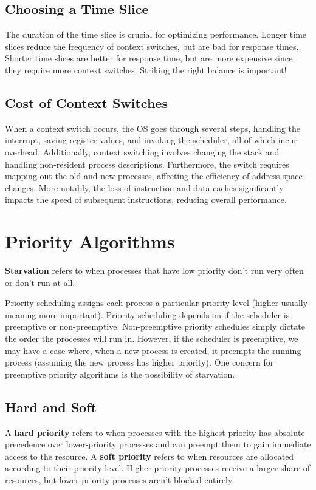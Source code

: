 \documentclass{report}
\newcommand{\definitionBegin}[1]{\begin{tcolorbox}[title={Definition: #1}]}
\newcommand{\definitionEnd}{\end{tcolorbox}}
\begin{document}
\subsection{Choosing a Time Slice}
The duration of the time slice is crucial for optimizing performance. Longer time slices reduce the
frequency of context switches, but are bad for response times. Shorter time slices are better for
response time, but are more expensive since they require more context switches. Striking the right
balance is important!


\subsection{Cost of Context Switches}
When a context switch occurs, the OS goes through several steps, handling the interrupt, saving
register values, and invoking the scheduler, all of which incur overhead. Additionally, context
switching involves changing the stack and handling non-resident process descriptions. Furthermore,
the switch requires mapping out the old and new processes, affecting the efficiency of address space
changes. More notably, the loss of instruction and data caches significantly impacts the speed of
subsequent instructions, reducing overall performance.


\section{Priority Algorithms}
\definitionBegin{Starvation}
\textbf{Starvation} refers to when processes that have low priority don't run very often or don't
run at all.
\definitionEnd

Priority scheduling assigns each process a particular priority level (higher usually meaning more
important). Priority scheduling depends on if the scheduler is preemptive or
non-preemptive. Non-preemptive priority schedules simply dictate the order the processes will run
in. However, if the scheduler is preemptive, we may have a case where, when a new process is
created, it preempts the running process (assuming the new process has higher priority). One concern
for preemptive priority algorithms is the possibility of starvation.


\subsection{Hard and Soft}
\definitionBegin{Hard and Soft Priorities}
A \textbf{hard priority} refers to when processes with the highest priority has absolute precedence
over lower-priority processes and can preempt them to gain immediate access to the resource.
\tcblower
A \textbf{soft priority} refers to when resources are allocated according to their priority
level. Higher priority processes receive a larger share of resources, but lower-priority
processes aren't blocked entirely.
\definitionEnd
\end{document}
